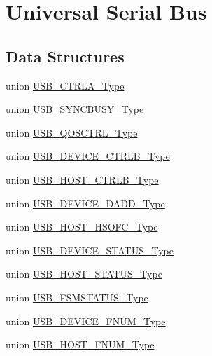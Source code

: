 \hypertarget{group___s_a_m_d21___u_s_b}{}\section{Universal Serial Bus}
\label{group___s_a_m_d21___u_s_b}
\subsection*{Data Structures}
\begin{DoxyCompactItemize}
\item 
union \mbox{\hyperlink{union_u_s_b___c_t_r_l_a___type}{U\+S\+B\+\_\+\+C\+T\+R\+L\+A\+\_\+\+Type}}
\item 
union \mbox{\hyperlink{union_u_s_b___s_y_n_c_b_u_s_y___type}{U\+S\+B\+\_\+\+S\+Y\+N\+C\+B\+U\+S\+Y\+\_\+\+Type}}
\item 
union \mbox{\hyperlink{union_u_s_b___q_o_s_c_t_r_l___type}{U\+S\+B\+\_\+\+Q\+O\+S\+C\+T\+R\+L\+\_\+\+Type}}
\item 
union \mbox{\hyperlink{union_u_s_b___d_e_v_i_c_e___c_t_r_l_b___type}{U\+S\+B\+\_\+\+D\+E\+V\+I\+C\+E\+\_\+\+C\+T\+R\+L\+B\+\_\+\+Type}}
\item 
union \mbox{\hyperlink{union_u_s_b___h_o_s_t___c_t_r_l_b___type}{U\+S\+B\+\_\+\+H\+O\+S\+T\+\_\+\+C\+T\+R\+L\+B\+\_\+\+Type}}
\item 
union \mbox{\hyperlink{union_u_s_b___d_e_v_i_c_e___d_a_d_d___type}{U\+S\+B\+\_\+\+D\+E\+V\+I\+C\+E\+\_\+\+D\+A\+D\+D\+\_\+\+Type}}
\item 
union \mbox{\hyperlink{union_u_s_b___h_o_s_t___h_s_o_f_c___type}{U\+S\+B\+\_\+\+H\+O\+S\+T\+\_\+\+H\+S\+O\+F\+C\+\_\+\+Type}}
\item 
union \mbox{\hyperlink{union_u_s_b___d_e_v_i_c_e___s_t_a_t_u_s___type}{U\+S\+B\+\_\+\+D\+E\+V\+I\+C\+E\+\_\+\+S\+T\+A\+T\+U\+S\+\_\+\+Type}}
\item 
union \mbox{\hyperlink{union_u_s_b___h_o_s_t___s_t_a_t_u_s___type}{U\+S\+B\+\_\+\+H\+O\+S\+T\+\_\+\+S\+T\+A\+T\+U\+S\+\_\+\+Type}}
\item 
union \mbox{\hyperlink{union_u_s_b___f_s_m_s_t_a_t_u_s___type}{U\+S\+B\+\_\+\+F\+S\+M\+S\+T\+A\+T\+U\+S\+\_\+\+Type}}
\item 
union \mbox{\hyperlink{union_u_s_b___d_e_v_i_c_e___f_n_u_m___type}{U\+S\+B\+\_\+\+D\+E\+V\+I\+C\+E\+\_\+\+F\+N\+U\+M\+\_\+\+Type}}
\item 
union \mbox{\hyperlink{union_u_s_b___h_o_s_t___f_n_u_m___type}{U\+S\+B\+\_\+\+H\+O\+S\+T\+\_\+\+F\+N\+U\+M\+\_\+\+Type}}

\end{DoxyCompactItemize}
